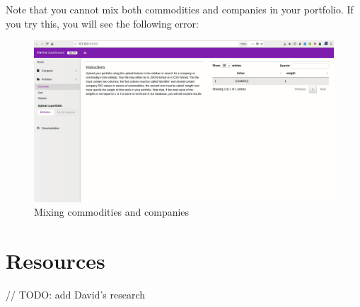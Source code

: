 \documentclass[]{book}
\theoremstyle{definition}
\theoremstyle{definition}
\theoremstyle{definition}
\theoremstyle{remark}
\begin{document}
Note that you cannot mix both commodities and companies in your
portfolio. If you try this, you will see the following error:

\begin{figure}
\centering
\includegraphics{img/mixcomms.gif}
\caption{Mixing commodities and companies}
\end{figure}

\chapter{Resources}\label{resources}

// TODO: add David's research


\end{document}
